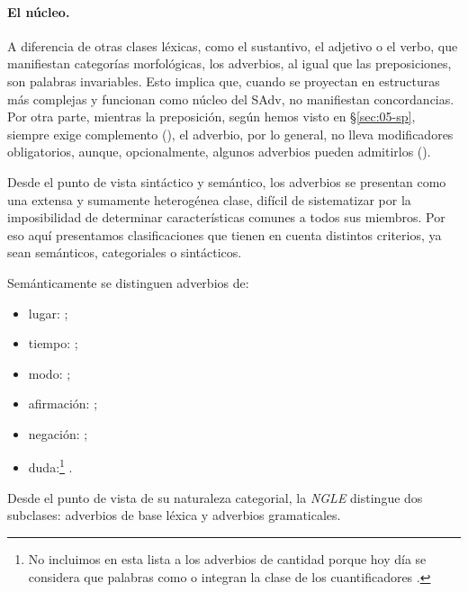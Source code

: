 \paragraph{El núcleo.} A diferencia de otras clases léxicas, como el
sustantivo, el adjetivo o el verbo, que manifiestan categorías morfológicas, los
adverbios, al igual que las preposiciones, son palabras invariables. Esto
implica que, cuando se proyectan en estructuras más complejas y funcionan como
núcleo del SAdv, no manifiestan concordancias. Por otra parte, mientras la
preposición, según hemos visto en §\ref{sec:05-sp}, siempre exige complemento
(), el adverbio, por lo general, no lleva
modificadores obligatorios, aunque, opcionalmente, algunos adverbios pueden
admitirlos ().

Desde el punto de vista sintáctico y semántico, los adverbios se presentan como
una extensa y sumamente heterogénea clase, difícil de sistematizar por la
imposibilidad de determinar características comunes a todos sus miembros. Por
eso aquí presentamos clasificaciones que tienen en cuenta distintos criterios,
ya sean semánticos, categoriales o sintácticos.

Semánticamente se distinguen adverbios de:

\begin{itemize}
  \item lugar: ;
  \item tiempo: ;
  \item modo: ;
  \item afirmación: ;
  \item negación: ;
  \item duda:\footnote{\label{fn:05-cuantificadores}No incluimos en esta lista a
        los adverbios de cantidad porque hoy día se considera que palabras como
         o  integran la clase de los
        cuantificadores \parencite{leonetti2007,bosque2009}.}
        .
\end{itemize}

Desde el punto de vista de su naturaleza categorial, la \textit{NGLE}
\parencite[§\,30.2j]{rae2025} distingue dos subclases: adverbios de base léxica
y adverbios gramaticales.

